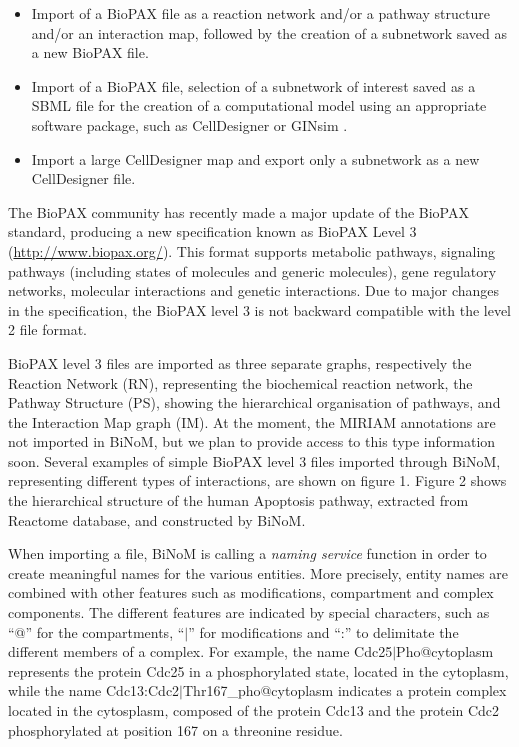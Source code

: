 \documentclass[10pt]{bmc_article}
\newenvironment{bmcformat}{\baselineskip20pt\sloppy\setboolean{publ}{false}}{\baselineskip20pt\sloppy}
\begin{document}
\begin{bmcformat}
\begin{itemize}
\item Import of a BioPAX file as a reaction network and/or a pathway structure
and/or an interaction map, followed by the creation of a subnetwork
saved as a new BioPAX file.

\item Import of a BioPAX file, selection of a subnetwork of interest saved as a
SBML file for
the creation of a computational model using an appropriate software package,
such as CellDesigner \cite{funahashi2003celldesigner} or GINsim
\cite{gonzalez2006ginsim}.

\item Import a large CellDesigner map and export only a subnetwork as a new CellDesigner file.

\end{itemize}

The BioPAX
community has recently made a major update of the BioPAX standard, producing a
new specification known as BioPAX Level 3 (\url{http://www.biopax.org/}). This
format supports metabolic pathways, signaling pathways (including states of molecules
and generic molecules), gene regulatory networks, molecular interactions and
genetic interactions. Due to major changes in the
specification, the BioPAX level 3 is not backward compatible with the level 2 file format.

BioPAX level 3 files are imported as three
separate graphs, respectively the Reaction Network (RN), representing the
biochemical reaction network, the Pathway Structure (PS), showing the
hierarchical organisation of pathways, and the Interaction Map graph
(IM). At the moment, the MIRIAM annotations are not imported in BiNoM, but we
plan to provide access to this type information soon. Several examples of simple
BioPAX level 3 files imported through BiNoM,
representing different types of interactions, are shown on figure 1. Figure 2
shows the hierarchical structure of the human Apoptosis pathway, extracted
from Reactome database, and constructed by BiNoM.

When importing a file, BiNoM is calling a \emph{naming service} function in
order to create meaningful names for the various entities. More precisely,
entity names are combined with other features such as modifications, compartment
and complex components. The different features are indicated by special
characters, such as ``@'' for the compartments, ``$|$'' for modifications and
``:'' to delimitate the different members of a complex. For example, the
name Cdc25$|$Pho@cytoplasm represents the protein Cdc25 in a phosphorylated
state, located in the cytoplasm, while the name
Cdc13:Cdc2$|$Thr167\_pho@cytoplasm indicates a protein complex located in the
cytosplasm, composed of the protein Cdc13 and the protein Cdc2 phosphorylated at
position 167 on a threonine residue.



\end{bmcformat}
\end{document}
